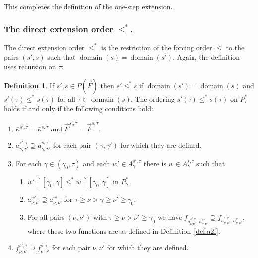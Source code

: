 \documentclass[
twoside,
]{article}
\theoremstyle{definition}
\newtheorem{definition}[theorem]{Definition}
\theoremstyle{remark}
\newcommand{\forceKappa}{\bar\kappa} %
\newcommand{\restrict}{{\upharpoonright}}
\DeclareMathOperator{\domain}{domain}
\begin{document}
This completes the definition of the one-step extension.
\subsubsection{The direct extension order $\le^*$.}
The direct extension order $\leq^*$  is the restriction of the
forcing order $\le$ to the pairs $(s',s)$ such that
$\domain(s)=\domain(s')$.
Again, the definition uses  recursion on $\tau$:

\begin{definition}
  \label{def:star-order} 
  If $s',s\in P(\vec F)$ then $s'\leq^* s$ if $\domain(s')=\domain(s)$
  and $s'(\tau)\le^* s(\tau)$ for all $\tau\in\domain(s)$.   The
  ordering $s'(\tau)\leq^* s(\tau)$ on $P^*_{\tau}$ holds if and only
  if the following   conditions hold:
  \begin{enumerate}
  \item $\forceKappa^{s',\tau}=\forceKappa^{s,\tau}$ and $\vec
    F^{s',\tau}=\vec F^{s,\tau}$. 
  \item \label{item:leq-star-a-fctns-extend}
    $a^{s',\tau}_{\gamma,\gamma'}\supseteq
    a^{s,\tau}_{\gamma,\gamma'}$ for each pair $(\gamma,\gamma')$ for 
    which they are defined. 
  \item\label{item:leq-star-change-w-in-A} 
    For each
    $\gamma\in(\gamma_0,\tau)$ and each $w'\in A^{s',\tau}_{\gamma}$
    there is $w\in A^{s,\tau}_{\gamma}$ such that
    \begin{enumerate}
    \item\label{item:SD-recursion} $w'\restrict[\gamma_0,\gamma]\leq^*
      w\restrict[\gamma_0,\gamma]$ in $P^*_{\gamma}$.      
    \item\label{item:a-extends} $a^{w'}_{\nu,\nu'}\supseteq a^{w}_{\nu,\nu'}$ for
      $\tau\geq\nu>\gamma\geq\nu'\geq\gamma_0$.
    \item\label{item:f-extends} For all pairs $(\nu,\nu')$ with
      $\tau\geq\nu>\nu'\geq\gamma_0$ we have 
     $     f_{a_{\nu,\nu'}^{s',\tau},\,a^{w'}_{\nu,\nu'}}\supseteq
     f_{a^{s,\tau}_{\nu,\nu'},\, a^{w}_{\nu,\nu'}}$, where these two
     functions are as defined in Definition~\ref{def:a2f}.
    \end{enumerate}
  \item\label{item:z} $f^{s',\tau}_{\nu,\nu'}\supseteq f^{s,\tau}_{\nu,\nu'}$ for each
    pair $\nu,\nu'$ for which they are defined.
  \end{enumerate}
\end{definition}
\end{document}
